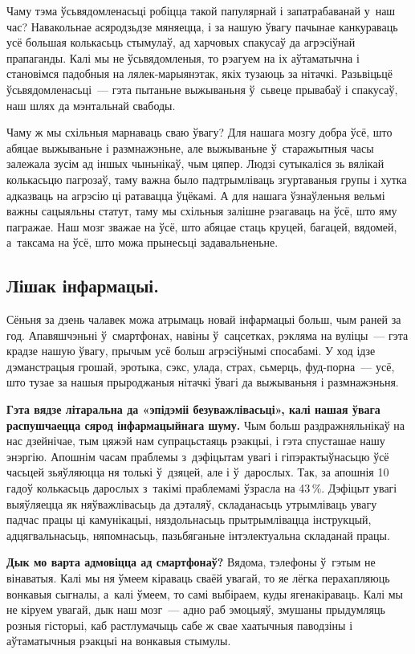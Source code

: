 Чаму тэма ўсьвядомленасьці робіцца такой папулярнай і запатрабаванай у~наш час? Навакольнае асяродзьдзе мяняецца, і за нашую ўвагу пачынае канкураваць усё большая колькасьць стымулаў, ад харчовых спакусаў да агрэсіўнай прапаганды. Калі мы не ўсьвядомленыя, то рэагуем на іх аўтаматычна і становімся падобныя на лялек-марыянэтак, якіх тузаюць за нітачкі. Разьвіцьцё ўсьвядомленасьці~--- гэта пытаньне выжываньня ў~сьвеце прывабаў і спакусаў, наш шлях да мэнтальнай свабоды.

Чаму ж мы схільныя марнаваць сваю ўвагу? Для нашага мозгу добра ўсё, што абяцае выжываньне і размнажэньне, але выжываньне ў~старажытныя часы залежала зусім ад іншых чыньнікаў, чым цяпер. Людзі сутыкаліся зь вялікай колькасьцю пагрозаў, таму важна было падтрымліваць згуртаваныя групы і хутка адказваць на агрэсію ці ратавацца ўцёкамі. А для нашага ўзнаўленьня вельмі важны сацыяльны статут, таму мы схільныя залішне рэагаваць на ўсё, што яму пагражае. Наш мозг зважае на ўсё, што абяцае стаць круцей, багацей, вядомей, а~таксама на ўсё, што можа прынесьці задавальненьне.

\subsection*{Лішак інфармацыі.}

Сёньня за дзень чалавек можа атрымаць новай інфармацыі больш, чым раней за год. Апавяшчэньні ў~смартфонах, навіны ў~сацсетках, рэкляма на вуліцы~--- гэта крадзе нашую ўвагу, прычым усё больш агрэсіўнымі спосабамі. У ход ідзе дэманстрацыя грошай, эротыка, сэкс, улада, страх, сьмерць, фуд-порна~--- усё, што тузае за нашыя прыроджаныя нітачкі ўвагі да выжываньня і размнажэньня.

\textbf{Гэта вядзе літаральна да «эпідэміі безуважлівасьці», калі нашая ўвага распушчаецца сярод інфармацыйнага шуму.} Чым больш раздражняльнікаў на нас дзейнічае, тым цяжэй нам супрацьстаяць рэакцыі, і гэта спусташае нашу энэргію. Апошнім часам праблемы з~дэфіцытам увагі і гіпэрактыўнасьцю ўсё часьцей зьяўляюцца ня толькі ў~дзяцей, але і ў~дарослых. Так, за апошнія 10 гадоў колькасьць дарослых з~такімі праблемамі ўзрасла на 43\,\%. Дэфіцыт увагі выяўляецца як няўважлівасьць да дэталяў, складанасьць утрымліваць увагу падчас працы ці камунікацыі, няздольнасьць прытрымлівацца інструкцый, адцягвальнасьць, няпомнасьць, пазьбяганьне інтэлектуальна складанай працы.

\textbf{Дык мо варта адмовіцца ад смартфонаў?} Вядома, тэлефоны ў~гэтым не вінаватыя. Калі мы ня ўмеем кіраваць сваёй увагай, то яе лёгка перахапляюць вонкавыя сыгналы, а~калі ўмеем, то самі выбіраем, куды ягенакіраваць. Калі мы не кіруем увагай, дык наш мозг~--- адно раб эмоцыяў, змушаны прыдумляць розныя гісторыі, каб растлумачыць сабе ж свае хаатычныя паводзіны і аўтаматычныя рэакцыі на вонкавыя стымулы.

